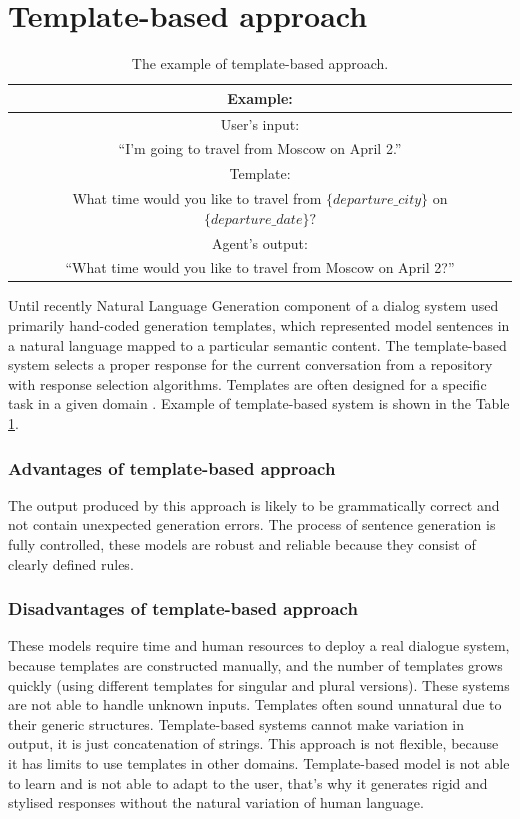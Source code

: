 \section{Template-based approach} 

\begin{table}[ht]
\centering
 \begin{tabular}{|c|} 
 \hline
 Example: \\
 \hline
 User's input: \\
 ``I'm going to travel from Moscow on April 2.'' \\ 
 \hline
 Template: \\
 What time would you like to travel from $\{departure\_city\}$ on $\{departure\_date\}?$ \\
 \hline
 Agent's output:\\
 ``What time would you like to travel from Moscow on April 2?'' \\
 \hline
 \end{tabular}
 \caption{The example of template-based approach.}
\label{tab:tb_example}
\end{table}

Until recently Natural Language Generation component of a dialog system used primarily hand-coded generation templates, which represented model sentences in a natural language mapped to a particular semantic content.
The template-based system selects a proper response for the current conversation from a repository with response selection algorithms. Templates are often designed for a specific task in a given domain \cite{manishina2016data}. 
Example of template-based system is shown in the Table \ref{tab:tb_example}.


\subsubsection{Advantages of template-based approach}
The output produced by this approach is likely to be grammatically correct and not contain unexpected generation errors. The process of sentence generation is fully controlled, these models are robust and reliable because they consist of clearly defined rules. 

\subsubsection{Disadvantages of template-based approach}
These models require time and human resources to deploy a real dialogue system, because templates are constructed manually, and the number of templates grows quickly (using different templates for singular and plural versions). These systems are not able to handle unknown inputs. Templates often sound unnatural due to their generic structures. Template-based systems cannot make variation in output, it is just concatenation of strings. This approach is not flexible, because it has limits to use templates in other domains. Template-based model is not able to learn and is not able to adapt to the user, that's why it generates rigid and stylised responses without the natural variation of human language.

